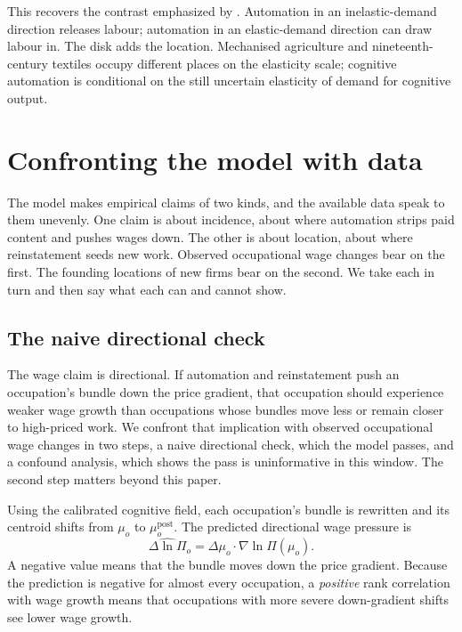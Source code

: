 \documentclass[12pt, a4paper]{article}
\begin{document}
This recovers the contrast emphasized by \textcite{bessen2019demand}.
Automation in an inelastic-demand direction releases labour; automation
in an elastic-demand direction can draw labour in. The disk adds the
location. Mechanised agriculture and nineteenth-century
textiles occupy different places on the elasticity scale; cognitive
automation is conditional on the still uncertain elasticity of demand
for cognitive output.

\section{Confronting the model with data}
\label{sec:directional-check}

The model makes empirical claims of two kinds, and the available data
speak to them unevenly. One claim is about incidence, about where
automation strips paid content and pushes wages down. The other is about
location, about where reinstatement seeds new work. Observed
occupational wage changes bear on the first. The founding locations of
new firms bear on the second. We take each in turn and then say what
each can and cannot show.

\subsection{The naive directional check}
\label{sec:check-naive}

The wage claim is directional. If automation and
reinstatement push an occupation's bundle down the price gradient, that
occupation should experience weaker wage growth than occupations whose
bundles move less or remain closer to high-priced work. We confront that
implication with observed occupational wage changes in two steps, a
naive directional check, which the model passes, and a confound
analysis, which shows the pass is uninformative in this window. The
second step matters beyond this paper.

Using the calibrated cognitive field, each occupation's bundle is
rewritten and its centroid shifts from $\mu_o$ to $\mu_o^{\text{post}}$. The
predicted directional wage pressure is
\begin{equation}
  \widehat{\Delta\ln\Pi}_o
  =
  \Delta\mu_o\cdot\nabla\ln\Pi(\mu_o).
  \label{eq:directional-pressure}
\end{equation}
A negative value means that the bundle moves down the price gradient.
Because the prediction is negative for almost every occupation, a
\emph{positive} rank correlation with wage growth means that occupations
with more severe down-gradient shifts see lower wage growth.
\end{document}
